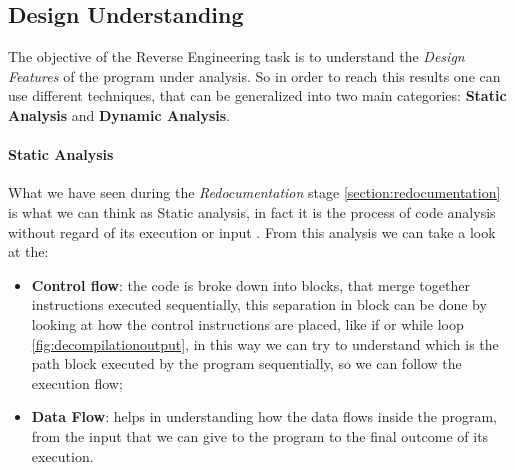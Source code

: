 \documentclass{article}
\begin{document}
\clearpage

\subsection{Design Understanding}
The objective of the Reverse Engineering task is to understand the \textit{Design Features} of the program under analysis. So in order to reach this results one can use different techniques, that can be generalized into two main categories: \textbf{Static Analysis} and \textbf{Dynamic Analysis}.

\paragraph{Static Analysis}
What we have seen during the \textit{Redocumentation} stage \ref{section:redocumentation} is what we can think as Static analysis, in fact it is the process of code analysis without regard of its execution or input \citep{LessonReverse}.
From this analysis we can take a look at the:
\begin{itemize}
    \item \textbf{Control flow}: the code is broke down into blocks, that merge together instructions executed sequentially, this separation in block can be done by looking at how the control instructions are placed, like if or while loop \ref{fig:decompilationoutput}, in this way we can try to understand which is the path block executed by the program sequentially, so we can follow the execution flow;
    \item \textbf{Data Flow}: helps in understanding how the data flows inside the program, from the input that we can give to the program to the final outcome of its execution.
\end{itemize}
\end{document}
